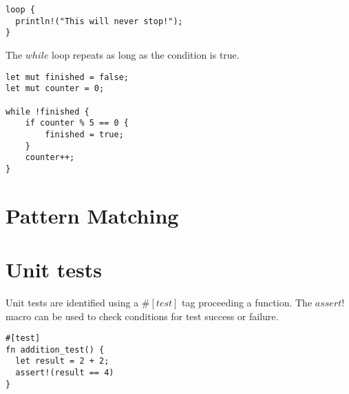 \documentclass[a0,final]{a0poster}
\begin{document}
\begin{multicols}{3}
\begin{verbatim}
loop {
  println!("This will never stop!");
}

\end{verbatim}

The $while$ loop repeats as long as the condition is true.

\begin{verbatim}
let mut finished = false;
let mut counter = 0;

while !finished {
    if counter % 5 == 0 {
        finished = true;
    }
    counter++;
}
\end{verbatim}

\section*{Pattern Matching}


\columnbreak

\section*{Unit tests}

Unit tests are identified using a $\#[test]$ tag proceeding a function. The $assert!$ macro can be used to check conditions for test success or failure.

\begin{verbatim}
#[test]
fn addition_test() {
  let result = 2 + 2;
  assert!(result == 4)
}
\end{verbatim}

\end{multicols}
\end{document}
